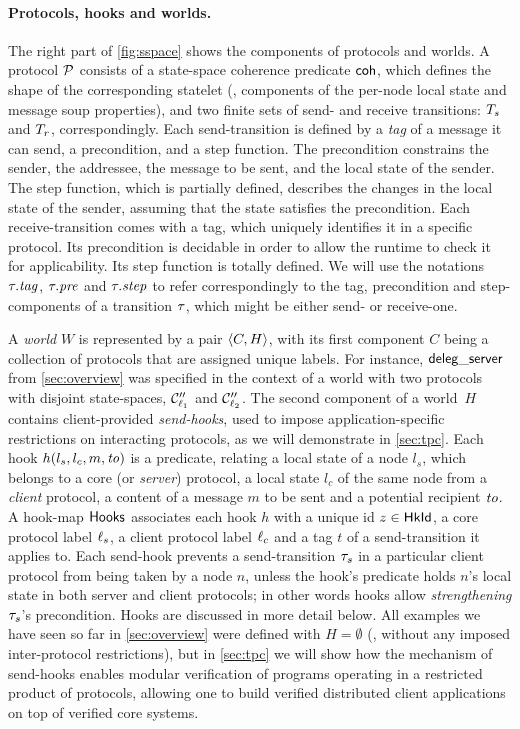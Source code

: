 \paragraph{Protocols, hooks and worlds.}
\label{sec:protocols-worlds}

The right part of \cref{fig:sspace} shows the components of \disel
protocols and worlds. A protocol $\mathcal{P}$ consists of a state-space
coherence predicate $\mathsf{coh}$, which defines the shape of the
corresponding statelet (\ie, components of the per-node local state
and message soup properties), and two finite sets of send- and receive
transitions: $T_s$ and $T_r$, correspondingly.
%
Each send-transition is defined by a \emph{tag} of a message it can
send, a precondition, and a step function. The precondition constrains
the sender, the addressee, the message to be sent, and the local state
of the sender.
%
The step function, which is partially defined, describes the changes
in the local state of the sender, assuming that the state satisfies
the precondition.
%
Each receive-transition comes with a tag, which uniquely identifies it
in a specific protocol. Its precondition is decidable in order to
allow the runtime to check it for applicability. Its
step function is totally defined.
%
We will use the notations $\tau.\mathit{tag}$, $\tau.\mathit{pre}$ and
$\tau.\mathit{step}$ to refer correspondingly to the tag, precondition and
step-components of a transition $\tau$, which might be either send-
or receive-one.

A \emph{world} $W$ is represented by a pair $\langle{C, H}\rangle$, with its
first component $C$ being a collection of protocols that are assigned
unique labels. For instance, $\mathsf{deleg\_server}$ from
\cref{sec:overview} was specified in the context of a world
with two protocols with disjoint state-spaces, $\mathcal{C}''_{\ell_1}$ and
$\mathcal{C}''_{\ell_2}$.
%
The second component of a world~$H$ contains client-provided
\emph{send-hooks}, used to impose application-specific restrictions on
interacting protocols, as we will demonstrate in
\cref{sec:tpc}.
%
Each hook $h(l_s, l_c, m, \mathit{to})$ is a predicate,
relating a local state of a node $l_s$, which belongs to a core (or
\emph{server}) protocol, a local state $l_c$ of the same node from a
\emph{client} protocol, a content of a message $m$ to be sent and a
potential recipient $\mathit{to}$. A hook-map $\mathsf{Hooks}$ associates each hook
$h$ with a unique id $z \in \mathsf{HkId}$, a core protocol label $\ell_s$, a
client protocol label $\ell_c$ and a tag $t$ of a send-transition it
applies to. Each send-hook prevents a send-transition $\tau_s$ in a
particular client protocol from being taken by a node $n$, unless the
hook's predicate holds \wrt $n$'s local state in both server and
client protocols; in other words hooks allow \emph{strengthening}
$\tau_s$'s precondition.  Hooks are discussed in more detail below.
%
All examples we have seen so far in \cref{sec:overview} were
defined with $H = \emptyset$ (\ie, without any imposed inter-protocol
restrictions), but in \cref{sec:tpc} we will show how the
mechanism of send-hooks enables modular verification of programs
operating in a restricted product of protocols, allowing one to build
verified distributed client applications on top of verified core
systems.

